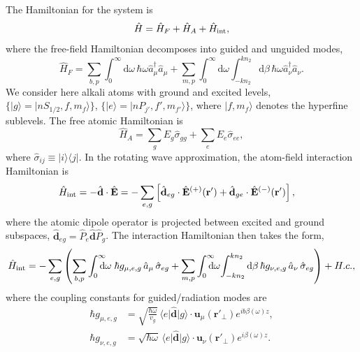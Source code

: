 \documentclass[preprint, aps,pra,onecolumn]{revtex4-1} %
\def\br{\mathbf{r}}
\def\bra#1{\langle{#1}\rvert}%
\def\ket#1{\lvert{#1}\rangle}%
\newcommand{\inter}{{\rm int}}
\begin{document}
The Hamiltonian for the system is
\begin{equation}
\hat{H} = \hat{H}_F+\hat{H}_A + \hat{H}_{\inter},
\end{equation}
where the free-field Hamiltonian decomposes into guided and unguided modes, 
	\begin{equation}
		\hat{H}_F = \sum_{b,p}\int_0^{\infty}\!\!\!\!\! \mathrm{d}\omega \, \hbar \omega \hat{a}^\dagger_\mu \hat{a}_\mu 
+\sum_{m,p} \int_0^{\infty}\!\!\!\!\! \mathrm{d}\omega  \int_{-k n_2}^{k n_2} \mathrm{d}\beta \, \hbar \omega 
\hat{a}^\dagger_\nu \hat{a}_\nu.
	\end{equation}
We consider here alkali atoms with ground and excited levels, $\{ \ket{g}=\ket{nS_{1/2}, f, m_f}\}$, $\{ \ket{e} =\ket{nP_{j'}, f', m_{f'}}\}$, where $\ket{f, m_f}$ denotes the hyperfine sublevels.  The free atomic Hamiltonian is
	\begin{equation}
		\hat{H}_A  = \sum_g E_g \hat{\sigma}_{gg} + \sum_e E_e \hat{\sigma}_{ee},
	\end{equation}
where $\hat{\sigma}_{ij} \equiv \ket{i}\bra{j}$.  In the rotating wave approximation, the atom-field interaction Hamiltonian is
	\begin{align}
		\hat{H}_{\inter} &= -\hat{\mathbf{d}}\cdot \hat{\mathbf{E}} =- \sum_{e,g} \left[ \hat{\mathbf{d}}_{eg}\cdot 
\hat{\mathbf{E}}^{(+)}(\br')+\hat{\mathbf{d}}_{ge}\cdot \hat{\mathbf{E}}^{(-)}(\br') \right],
	\end{align}
where the atomic dipole operator is projected between excited and ground subspaces, $\hat{\mathbf{d}}_{eg}= \hat{P}_e \hat{\mathbf{d}} \hat{P}_g $. The interaction Hamiltonian then takes the form, 
\begin{equation}
	\hat{H}_{\inter} = -\sum_{e,g} \left(\sum_{b,p} \int_0^{\infty}\!\!\!\!\!\mathrm{d}\omega \; \hbar g_{\mu, e,g}\, \hat{a}_\mu  \, 
		\hat{\sigma}_{eg}+ \sum_{m,p} \int_0^{\infty}\!\!\!\!\!\mathrm{d}\omega \! \int_{-kn_2}^{kn_2}\mathrm{d}\beta \,  \hbar 
g_{\nu, e,g}\, \hat{a}_\nu \, \hat{\sigma}_{eg}\right) + {H.c.},
	\end{equation}
where the coupling constants for guided/radiation modes are
\begin{subequations} \label{Eq::CouplingConstants}
	\begin{align}
		\hbar g_{\mu, e,g} &= \sqrt{\frac{\hbar \omega}{ v_g  }}\, \bra{e} \hat{\mathbf{d}} \ket{g} 
\cdot\mathbf{u}_\mu ( \br'_\perp ) e^{i b \beta(\omega)z} , \\
		\hbar g_{\nu, e,g} &= \sqrt{  \hbar \omega } \, \bra{e} \hat{\mathbf{d}} \ket{g} \cdot \mathbf{u}_\nu ( \br'_\perp) e^{i\beta(\omega)z}  .
	\end{align}
\end{subequations}
\end{document}
